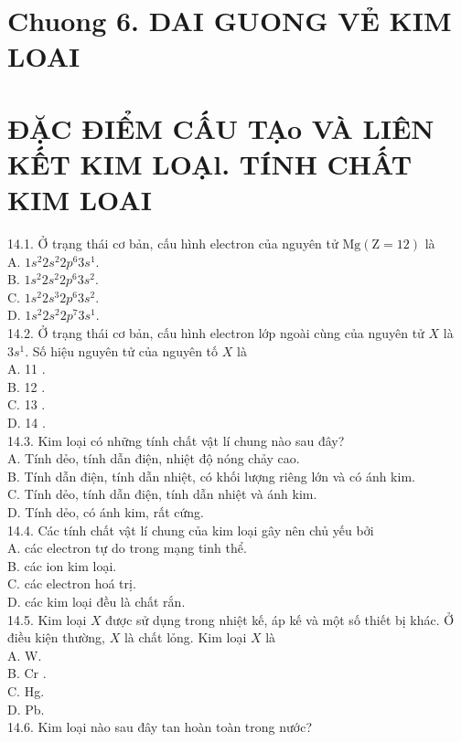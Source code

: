 \documentclass[10pt]{article}
\begin{document}
\section*{Chuong 6. DAI GUONG VẺ KIM LOAI}
\section*{ĐẶC ĐIỂM CẤU TẠo VÀ LIÊN KẾT KIM LOẠl. TÍNH CHẤT KIM LOAI}
14.1. Ở trạng thái cơ bản, cấu hình electron của nguyên tử $\mathrm{Mg}(\mathrm{Z}=12)$ là\\
A. $1 s^{2} 2 s^{2} 2 p^{6} 3 s^{1}$.\\
B. $1 s^{2} 2 s^{2} 2 p^{6} 3 s^{2}$.\\
C. $1 s^{2} 2 s^{3} 2 p^{6} 3 s^{2}$.\\
D. $1 s^{2} 2 s^{2} 2 p^{7} 3 s^{1}$.\\
14.2. Ở trạng thái cơ bản, cấu hình electron lớp ngoài cùng của nguyên tử $X$ là $3 s^{1}$. Số hiệu nguyên tử của nguyên tố $X$ là\\
A. 11 .\\
B. 12 .\\
C. 13 .\\
D. 14 .\\
14.3. Kim loại có những tính chất vật lí chung nào sau đây?\\
A. Tính dẻo, tính dẫn điện, nhiệt độ nóng chảy cao.\\
B. Tính dẫn điện, tính dẫn nhiệt, có khối lượng riêng lớn và có ánh kim.\\
C. Tính dẻo, tính dẫn điện, tính dẫn nhiệt và ánh kim.\\
D. Tính dẻo, có ánh kim, rất cứng.\\
14.4. Các tính chất vật lí chung của kim loại gây nên chủ yếu bởi\\
A. các electron tự do trong mạng tinh thể.\\
B. các ion kim loại.\\
C. các electron hoá trị.\\
D. các kim loại đều là chất rắn.\\
14.5. Kim loại $X$ được sử dụng trong nhiệt kế, áp kế và một số thiết bị khác. Ở điều kiện thường, $X$ là chất lỏng. Kim loại $X$ là\\
A. W.\\
B. Cr .\\
C. Hg.\\
D. Pb.\\
14.6. Kim loại nào sau đây tan hoàn toàn trong nước?\\
\end{document}
